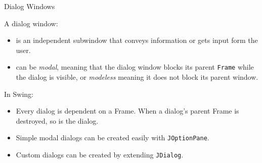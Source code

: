 \documentclass{beamer}
\begin{document}
\begin{frame}[fragile]{Dialog Windows}


A dialog window:
\begin{itemize}
\item is an independent subwindow that conveys information or gets input form the user.
\item can be {\it modal}, meaning that the dialog window blocks its parent {\tt Frame} while the dialog is visible, or {\it modeless} meaning it does not block its parent window.
\end{itemize}
In Swing:
\begin{itemize}
\item Every dialog is dependent on a Frame.  When a dialog's parent Frame is destroyed, so is the dialog.
\item Simple modal dialogs can be created easily with {\tt JOptionPane}.
\item Custom dialogs can be created by extending {\tt JDialog}.
\end{itemize}

\end{frame}
\end{document}
